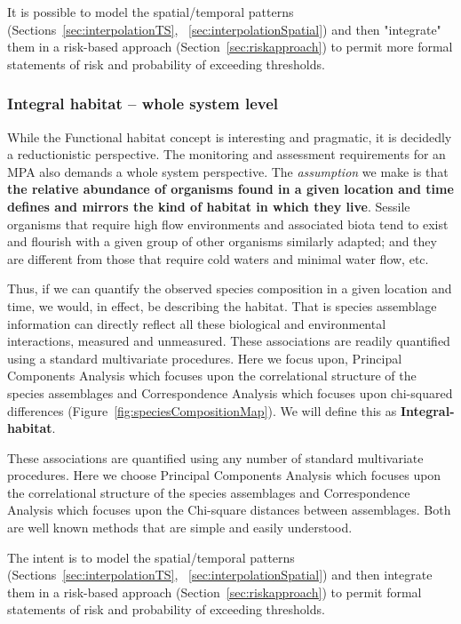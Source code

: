 \documentclass[letterpaper,portrait,11pt]{scrartcl}
\numberwithin{equation}{section}		%
\numberwithin{figure}{section}		%
\numberwithin{table}{section}				%
\begin{document}
It is possible to model the spatial/temporal patterns (Sections~\ref{sec:interpolationTS}, ~\ref{sec:interpolationSpatial}) and then "integrate" them in a risk-based approach (Section~\ref{sec:riskapproach}) to permit more formal statements of risk and probability of exceeding thresholds. 


\subsubsection{Integral habitat -- whole system level}
\label{sec:integralHabitat}

While the Functional habitat concept is interesting and pragmatic, it is decidedly a reductionistic perspective. The monitoring and assessment requirements for an MPA also demands a whole system perspective. The \textit{assumption} we make is that \textbf{the relative abundance of organisms found in a given location and time defines and mirrors the kind of habitat in which they live}. Sessile organisms that require high flow environments and associated biota tend to exist and flourish with a given group of other organisms similarly adapted; and they are different from those that require cold waters and minimal water flow, etc. 

Thus, if we can quantify the observed species composition in a given location and time, we would, in effect, be describing the habitat. That is species assemblage information can directly reflect all these biological and environmental interactions, measured and unmeasured. These associations are readily quantified using a standard multivariate procedures. Here we focus upon, Principal Components Analysis which focuses upon the correlational structure of the species assemblages and Correspondence Analysis which focuses upon chi-squared differences (Figure~\ref{fig:speciesCompositionMap}). We will define this as \textbf{Integral-habitat}. 

These associations are quantified using any number of standard multivariate procedures. Here we choose Principal Components Analysis which focuses upon the correlational structure of the species assemblages and Correspondence Analysis which focuses upon the Chi-square distances between assemblages. Both are well known methods that are simple and easily understood. 

The intent is to model the spatial/temporal patterns (Sections~\ref{sec:interpolationTS}, ~\ref{sec:interpolationSpatial}) and then integrate them in a risk-based approach (Section~\ref{sec:riskapproach}) to permit formal statements of risk and probability of exceeding thresholds. 
\end{document}
